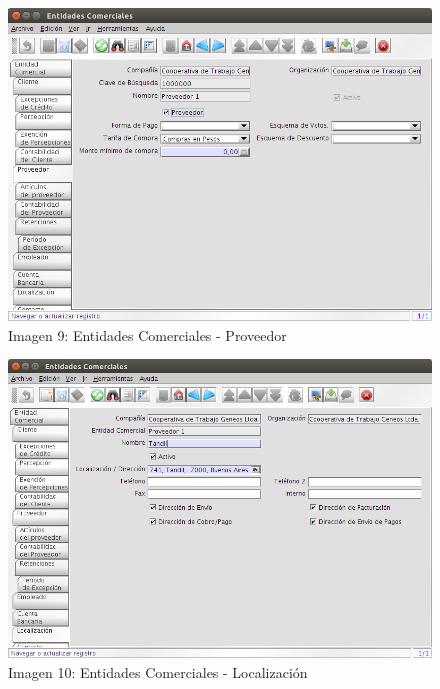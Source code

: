 \documentclass[letterpaper,10pt,spanish]{sphinxmanual}
\begin{document}
\begin{figure}[htbp]
\centering
\capstart

\includegraphics{ly_prov_prov.png}
\caption{Imagen 9: Entidades Comerciales - Proveedor}\end{figure}
\begin{figure}[htbp]
\centering
\capstart

\includegraphics{ly_prov_dir.png}
\caption{Imagen 10: Entidades Comerciales - Localización}\end{figure}
\end{document}
